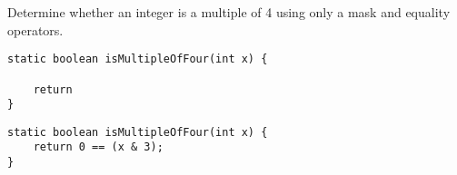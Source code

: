 \question Determine whether an integer is a multiple of 4 using only a mask and equality operators.

\ifprintanswers\else
\begin{lstlisting}
static boolean isMultipleOfFour(int x) {

    return
}
\end{lstlisting}
\fi

\begin{solution}
\begin{lstlisting}
static boolean isMultipleOfFour(int x) {
    return 0 == (x & 3);
}
\end{lstlisting}
\end{solution}